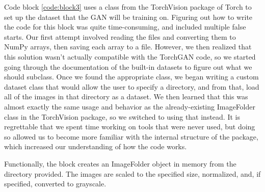 \documentclass[11pt,letterpaper]{article}
\begin{document}
		Code block \ref{code:block3} uses a class from the TorchVision package of Torch to set up the dataset that the GAN will be training on.
		Figuring out how to write the code for this block was quite time-consuming, and included multiple false starts.
		Our first attempt involved reading the files and converting them to NumPy arrays, then saving each array to a file.
		However, we then realized that this solution wasn't actually compatible with the TorchGAN code, so we started going through the documentation of the built-in datasets to figure out what we should subclass.
		Once we found the appropriate class, we began writing a custom dataset class that would allow the user to specify a directory, and from that, load all of the images in that directory as a dataset.
		We then learned that this was almost exactly the same usage and behavior as the already-existing ImageFolder class in the TorchVision package, so we switched to using that instead.
		It is regrettable that we spent time working on tools that were never used, but doing so allowed us to become more familiar with the internal structure of the package, which increased our understanding of how the code works.

		Functionally, the block creates an ImageFolder object in memory from the directory provided.
		The images are scaled to the specified size, normalized, and, if specified, converted to grayscale.
\end{document}
